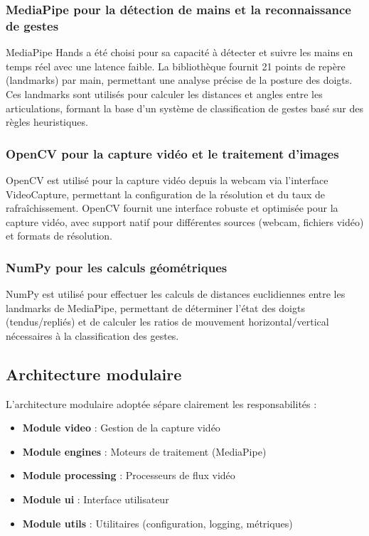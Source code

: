 \documentclass[12pt,a4paper]{article}
\begin{document}
\subsubsection{MediaPipe pour la détection de mains et la reconnaissance de gestes}

MediaPipe Hands a été choisi pour sa capacité à détecter et suivre les mains en temps réel avec une latence faible. La bibliothèque fournit 21 points de repère (landmarks) par main, permettant une analyse précise de la posture des doigts. Ces landmarks sont utilisés pour calculer les distances et angles entre les articulations, formant la base d'un système de classification de gestes basé sur des règles heuristiques.

\subsubsection{OpenCV pour la capture vidéo et le traitement d'images}

OpenCV est utilisé pour la capture vidéo depuis la webcam via l'interface VideoCapture, permettant la configuration de la résolution et du taux de rafraîchissement. OpenCV fournit une interface robuste et optimisée pour la capture vidéo, avec support natif pour différentes sources (webcam, fichiers vidéo) et formats de résolution.

\subsubsection{NumPy pour les calculs géométriques}

NumPy est utilisé pour effectuer les calculs de distances euclidiennes entre les landmarks de MediaPipe, permettant de déterminer l'état des doigts (tendus/repliés) et de calculer les ratios de mouvement horizontal/vertical nécessaires à la classification des gestes.

\subsection{Architecture modulaire}

L'architecture modulaire adoptée sépare clairement les responsabilités :

\begin{itemize}
    \item \textbf{Module video} : Gestion de la capture vidéo
    \item \textbf{Module engines} : Moteurs de traitement (MediaPipe)
    \item \textbf{Module processing} : Processeurs de flux vidéo
    \item \textbf{Module ui} : Interface utilisateur
    \item \textbf{Module utils} : Utilitaires (configuration, logging, métriques)
\end{itemize}
\end{document}
